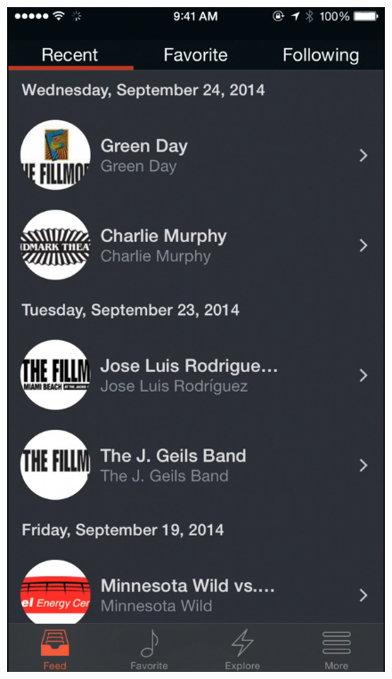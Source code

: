 \begin{figure}
\begin{minipage}{.5\textwidth}
        	\includegraphics[width=.7\linewidth]{./pics/app2.png}
        \end{minipage}
        \end{figure}
